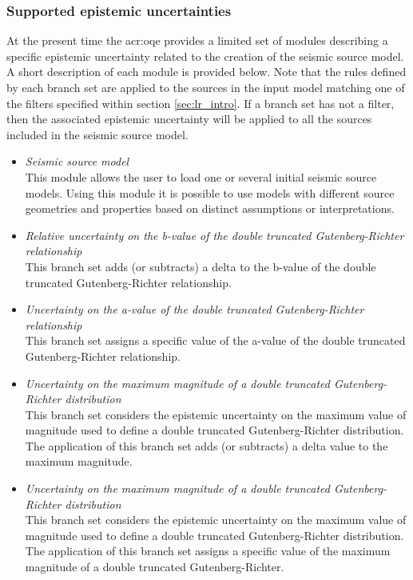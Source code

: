 \subsubsection{Supported epistemic uncertainties}
At the present time the \gls{acr:oqe} provides a limited set of modules 
describing a specific epistemic uncertainty related to the creation of 
the seismic source model.
%
A short description of each module is provided below. Note that 
the rules defined by each branch set are applied to the sources 
in the input model matching one of the filters specified within
section \ref{sec:lr_intro}. 
%
If a branch set has not a filter, then the associated epistemic 
uncertainty will be applied to all the sources included in the 
seismic source model.
%
\begin{itemize}
    \item \emph{Seismic source model} \hfill \\
        This module allows the user to load one or several initial seismic 
        source models. Using this module it is possible to use models
        with different source geometries and properties based on distinct 
        assumptions or interpretations.
    \item \emph{Relative uncertainty on the b-value of the double truncated 
        Gutenberg-Richter relationship} \hfill \\
        This branch set adds (or subtracts) a delta to the b-value of the 
        double truncated Gutenberg-Richter relationship.
    \item \emph{Uncertainty on the a-value of the double 
        truncated Gutenberg-Richter relationship} \hfill \\ This branch set
        assigns a specific value of the a-value of the double truncated
        Gutenberg-Richter relationship.
    \item \emph{Uncertainty on the maximum magnitude of a double 
        truncated Gutenberg-Richter distribution} \hfill \\ 
        This branch set considers the epistemic uncertainty on the maximum 
        value of magnitude used to define a double truncated Gutenberg-Richter 
        distribution. The application of this branch set adds 
        (or subtracts) a delta value to the maximum magnitude.
   \item \emph{Uncertainty on the maximum magnitude of a double 
        truncated Gutenberg-Richter distribution} \hfill \\ 
        This branch set considers the epistemic uncertainty on the maximum 
        value of magnitude used to define a double truncated Gutenberg-Richter 
        distribution. The application of this branch set  
        assigns a specific value of the maximum magnitude of a double truncated 
        Gutenberg-Richter.
\end{itemize}
